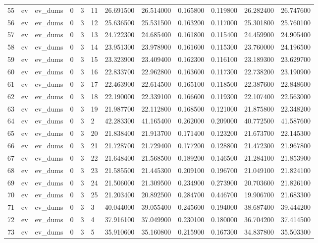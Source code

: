 \begin{tabular}{llllllrrrrrr}
55 & ev & ev_dums & 0 & 3 & 11 & 26.691500 & 26.514000 & 0.165800 & 0.119800 & 26.282400 & 26.747600 \\
56 & ev & ev_dums & 0 & 3 & 12 & 25.636500 & 25.531500 & 0.163200 & 0.117000 & 25.301800 & 25.760100 \\
57 & ev & ev_dums & 0 & 3 & 13 & 24.722300 & 24.685400 & 0.161800 & 0.115400 & 24.459900 & 24.905400 \\
58 & ev & ev_dums & 0 & 3 & 14 & 23.951300 & 23.978900 & 0.161600 & 0.115300 & 23.760000 & 24.196500 \\
59 & ev & ev_dums & 0 & 3 & 15 & 23.323900 & 23.409400 & 0.162300 & 0.116100 & 23.189300 & 23.629700 \\
60 & ev & ev_dums & 0 & 3 & 16 & 22.833700 & 22.962800 & 0.163600 & 0.117300 & 22.738200 & 23.190900 \\
61 & ev & ev_dums & 0 & 3 & 17 & 22.463900 & 22.614500 & 0.165100 & 0.118500 & 22.387600 & 22.848600 \\
62 & ev & ev_dums & 0 & 3 & 18 & 22.190000 & 22.339100 & 0.166600 & 0.119300 & 22.107400 & 22.563000 \\
63 & ev & ev_dums & 0 & 3 & 19 & 21.987700 & 22.112800 & 0.168500 & 0.121000 & 21.875800 & 22.348200 \\
64 & ev & ev_dums & 0 & 3 & 2 & 42.283300 & 41.165400 & 0.262000 & 0.209000 & 40.772500 & 41.587600 \\
65 & ev & ev_dums & 0 & 3 & 20 & 21.838400 & 21.913700 & 0.171400 & 0.123200 & 21.673700 & 22.145300 \\
66 & ev & ev_dums & 0 & 3 & 21 & 21.728700 & 21.729400 & 0.177200 & 0.128800 & 21.472300 & 21.967800 \\
67 & ev & ev_dums & 0 & 3 & 22 & 21.648400 & 21.568500 & 0.189200 & 0.146500 & 21.284100 & 21.853900 \\
68 & ev & ev_dums & 0 & 3 & 23 & 21.585500 & 21.445300 & 0.209100 & 0.196700 & 21.049100 & 21.824100 \\
69 & ev & ev_dums & 0 & 3 & 24 & 21.506000 & 21.309500 & 0.234900 & 0.273900 & 20.703600 & 21.826100 \\
70 & ev & ev_dums & 0 & 3 & 25 & 21.203400 & 20.892500 & 0.284700 & 0.446700 & 19.906700 & 21.683300 \\
71 & ev & ev_dums & 0 & 3 & 3 & 40.044000 & 39.055400 & 0.245600 & 0.194000 & 38.687400 & 39.444200 \\
72 & ev & ev_dums & 0 & 3 & 4 & 37.916100 & 37.049900 & 0.230100 & 0.180000 & 36.704200 & 37.414500 \\
73 & ev & ev_dums & 0 & 3 & 5 & 35.910600 & 35.160800 & 0.215900 & 0.167300 & 34.837800 & 35.503300 \\

\end{tabular}
